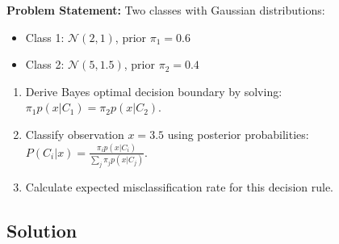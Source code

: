 \documentclass[12pt]{article}
\begin{document}
\textbf{Problem Statement:} Two classes with Gaussian distributions:
\begin{itemize}
\item Class 1: $\mathcal{N}(2, 1)$, prior $\pi_1 = 0.6$
\item Class 2: $\mathcal{N}(5, 1.5)$, prior $\pi_2 = 0.4$
\end{itemize}

\begin{enumerate}
\item[(a)] Derive Bayes optimal decision boundary by solving: $\pi_1 p(x|C_1) = \pi_2 p(x|C_2)$.
\item[(b)] Classify observation $x = 3.5$ using posterior probabilities: $P(C_i|x) = \frac{\pi_i p(x|C_i)}{\sum_j \pi_j p(x|C_j)}$.
\item[(c)] Calculate expected misclassification rate for this decision rule.
\end{enumerate}

\subsection*{Solution}
\end{document}
